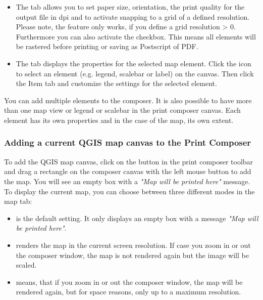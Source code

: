 \begin{itemize}
\item The  tab allows you to set paper size, orientation, the
print quality for the output file in dpi and to activate snapping to a grid
of a defined resolution. Please note, the  feature
only works, if you define a grid resolution > 0. Furthermore you can also
activate the  checkbox. This means all elements
will be rastered before printing or saving as Postscript of PDF.
\item The  tab displays the properties for the selected map element. 
Click the  
icon to select an element (e.g. legend, scalebar or label) on the canvas. 
Then click the Item tab and customize the settings for the selected 
element.
\end{itemize}

You can add multiple elements to the composer. It is also possible to have 
more than one map view or legend or scalebar in the print composer canvas. 
Each element has its own properties and in the case of the map, its own 
extent.

\subsubsection{Adding a current QGIS map canvas to the Print Composer}

To add the QGIS map canvas, click on the  button in the print composer toolbar and drag a 
rectangle on the composer canvas with the left mouse button to add the map. 
You will see an empty box with a \textit{"Map will be printed here"} message.
To display the current map, you can choose between three different modes in
the map  tab:

\begin{itemize}
\item {} is the default setting. It only
displays an empty box with a message \textit{"Map will be printed here"}. 
\item {} renders the map in the current screen
resolution. If case you zoom in or out the composer window, the map is not
rendered again but the image will be scaled.
\item {} means, that if you zoom in or out the
composer window, the map will be rendered again, but for space reasons, only
up to a maximum resolution.
\end{itemize}

